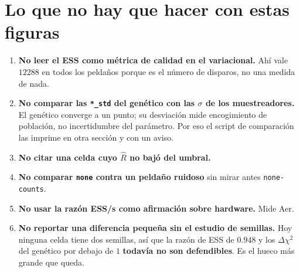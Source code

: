 \documentclass[11pt,a4paper]{article}
\begin{document}
\section{Lo que no hay que hacer con estas figuras}

\begin{enumerate}[leftmargin=1.6em]
  \item \textbf{No leer el ESS como métrica de calidad en el variacional.}
    Ahí vale $12288$ en todos los peldaños porque es el número de disparos,
    no una medida de nada.
  \item \textbf{No comparar las \texttt{*\_std} del genético con las $\sigma$
    de los muestreadores.} El genético converge a un punto; su desviación
    mide encogimiento de población, no incertidumbre del parámetro. Por eso
    el script de comparación las imprime en otra sección y con un aviso.
  \item \textbf{No citar una celda cuyo $\hat{R}$ no bajó del umbral.}
  \item \textbf{No comparar \texttt{none} contra un peldaño ruidoso} sin
    mirar antes \texttt{none-counts}.
  \item \textbf{No usar la razón ESS/s como afirmación sobre hardware.} Mide
    Aer.
  \item \textbf{No reportar una diferencia pequeña sin el estudio de
    semillas.} Hoy ninguna celda tiene dos semillas, así que la razón de ESS
    de $0.948$ y los $\Delta\chi^2$ del genético por debajo de $1$
    \textbf{todavía no son defendibles}. Es el hueco más grande que queda.
\end{enumerate}
\end{document}
